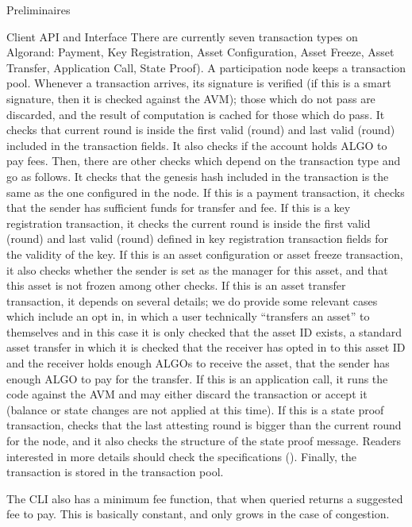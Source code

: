 \documentclass[10pt,a4paper]{article}
\begin{document}
\begin{section}{Preliminaires}
\begin{subsection}{Client API and Interface}
    There are currently seven transaction types on Algorand:
        Payment, 
        Key Registration, 
        Asset Configuration, 
        Asset Freeze, 
        Asset Transfer, 
        Application Call, 
        State Proof).
    A participation node keeps a transaction pool. 
    Whenever a transaction arrives, 
        its signature is verified (if this is a smart signature, then it is checked against the AVM); those
        which do not pass are discarded, and the result of computation is cached for those which do pass.
    It checks that current round is inside the first valid (round) and last valid (round) included in the
        transaction fields.
    It also checks if the account holds ALGO to pay fees. Then, there are other checks which depend on the
        transaction type and go as follows.
    It checks that the genesis hash included in the transaction is the same as the one configured in the node.
    If this is a payment transaction, it checks that the sender has sufficient funds for transfer and fee.
    If this is a key  registration transaction, it checks the current round is inside the first valid (round) 
        and last valid (round) defined in key registration transaction fields for the validity of the key.
    If this is an asset configuration or asset freeze transaction, it also checks whether the sender is set 
        as the manager for this asset, and that this asset is not frozen among other checks.
    If this is an asset transfer transaction, it depends on several details; we do provide some relevant 
        cases which include an opt in, in which a user technically ``transfers an asset'' to themselves and in this
        case it is only checked that the asset ID exists, 
        a standard asset transfer in which it is checked that the receiver has opted in to this asset ID and the 
        receiver holds enough ALGOs to receive the asset, that the sender has enough ALGO to pay for the transfer.
    If this is an application call, it runs the code against the AVM and may either discard the transaction or 
        accept it (balance or state changes are not applied at this time).
    If this is a state proof transaction, checks that the last attesting round is bigger than the current 
        round for the node, and it also checks the structure of the state proof message.
    Readers interested in more details should check the specifications (\cite{algorand:specs}).
    Finally, the transaction is stored in the transaction pool. 

    The CLI also has a minimum fee function, that when queried returns a suggested fee 
    to pay. This is basically constant, and only grows in the case of congestion.




\end{subsection}
\end{section}
\end{document}
